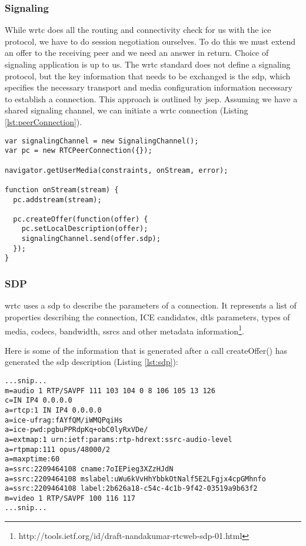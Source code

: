 \subsubsection{Signaling}
While \gls{wrtc} does all the routing and connectivity check for us with the \gls{ice} protocol, we have to do session negotiation ourselves. To do this we must extend an offer to the receiving peer and we need an answer in return. Choice of signaling application is up to us. The \gls{wrtc} standard does not define a signaling protocol, but the key information that needs to be exchanged is the \gls{sdp}, which specifies the necessary transport and media configuration information necessary to establish a connection. This approach is outlined by \gls{jsep}. Assuming we have a shared signaling channel, we can initiate a \gls{wrtc} connection (Listing \ref{lst:peerConnection}).


\begin{lstlisting}[caption={Initiating a RTCPeerConnection in WebRTC}, label={lst:peerConnection}]
var signalingChannel = new SignalingChannel();
var pc = new RTCPeerConnection({});

navigator.getUserMedia(constraints, onStream, error);

function onStream(stream) {
  pc.addstream(stream);

  pc.createOffer(function(offer) {
    pc.setLocalDescription(offer);
    signalingChannel.send(offer.sdp);
  });
}
\end{lstlisting}


\subsubsection{SDP}
\gls{wrtc} uses a \gls{sdp} to describe the parameters of a connection. It represents a list of properties describing the connection, ICE candidates, \gls{dtls} parameters, types of media, codecs, bandwidth, \gls{ssrc}s and other metadata information\footnote{http://tools.ietf.org/id/draft-nandakumar-rtcweb-sdp-01.html}.



Here is some of the information that is generated after a call createOffer() has generated the \gls{sdp} description (Listing \ref{lst:sdp}):

\begin{lstlisting}[frame=single, caption={Snippet of a SDP description}, label={lst:sdp}]
...snip...
m=audio 1 RTP/SAVPF 111 103 104 0 8 106 105 13 126
c=IN IP4 0.0.0.0
a=rtcp:1 IN IP4 0.0.0.0
a=ice-ufrag:fAYfQM/iWMQPqiHs
a=ice-pwd:pgbuPPRdpKq+obC0lyRxVDe/
a=extmap:1 urn:ietf:params:rtp-hdrext:ssrc-audio-level
a=rtpmap:111 opus/48000/2
a=maxptime:60
a=ssrc:2209464108 cname:7oIEPieg3XZzHJdN
a=ssrc:2209464108 mslabel:uWu6kVvHhYbbkOtNalf5E2LFgjx4cpGMhnfo
a=ssrc:2209464108 label:2b626a18-c54c-4c1b-9f42-03519a9b63f2
m=video 1 RTP/SAVPF 100 116 117
...snip...
\end{lstlisting}


